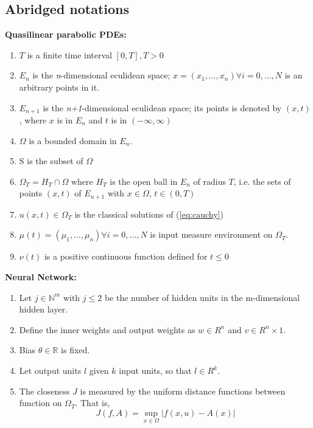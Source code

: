 \documentclass{article}
\begin{document}
	\subsection{Abridged notations}
	\textbf{Quasilinear parabolic PDEs:}
	\begin{enumerate}
			\item $T$ is a finite time interval $[0,T], T>0$
		\item $E_{n}$ is the \textit{n}-dimensional eculidean space; $x = (x_1, \dots , x_n) \forall i = 0, \dots, N$ is an arbitrary points in it.
		\item $E_{n+1}$ is the \textit{n+1}-dimensional eculidean space;
		its points is denoted by $(x,t)$, where $x$ is in $E_{n}$ and $t$ is in $(- \infty, \infty)$
		\item $\Omega$ is a bounded domain in $E_{n}$.
		\item S is the subset of $\Omega$
		\item $\Omega_{T} = H_{T} \cap \Omega$ where $H_{T}$ is the open ball in $E_{n}$ of radius $T$, i.e. the sets of points $(x,t)$ of $E_{n+1}$ with $x \in \Omega$, $t \in (0,T)$
		\item $u(x,t) \in \Omega_{T}$ is the classical solutions of (\ref{eq:cauchy})
		\item $\mu(t)=(\mu_1, \dots, \mu_{n}) \forall i = 0, \dots, N$ is input measure environment on $\Omega_{T}$.
		\item $\nu(t)$ is a positive continuous function defined for $t \leq 0$
	\end{enumerate}
	\textbf{Neural Network:}
	\begin{enumerate}
		\item Let $j \in \mathbb{N}^m$ with $j \leq 2$ be the number of hidden units in the m-dimensional hidden layer.
		\item Define the inner weights and output weights as $w \in R^n$ and $v \in R^n\times 1$.
		\item Bias $\theta \in \mathbb{R}$ is fixed.
		\item Let output units $\textit{l}$ given $k$ input units, so that $\textit{l} \in R^{k}$.
		\item The closeness $J$ is measured by the uniform distance functions between function on $\Omega_{T}$. That is, \[J(f,A) = \sup_{x \in \Omega}|f(x,u)-A(x)| \]
\end{enumerate}
\end{document}

